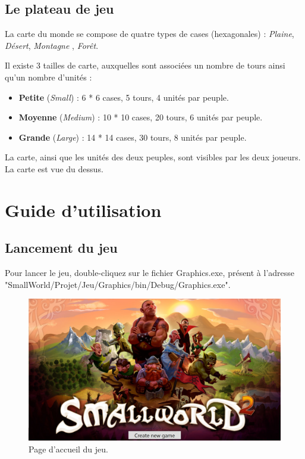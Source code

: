 \subsection{Le plateau de jeu}

La carte du monde se compose de quatre types de cases (hexagonales) : \textit{Plaine}, \textit{Désert}, \textit{Montagne} , \textit{Forêt}.

Il existe 3 tailles de carte, auxquelles sont associées un nombre de tours ainsi qu'un nombre d'unités :

\begin{itemize}

\item \textbf{Petite} (\textit{Small}) : 6 * 6 cases, 5 tours, 4 unités par peuple.
\item \textbf{Moyenne} (\textit{Medium}) : 10 * 10 cases, 20 tours, 6 unités par peuple.
\item \textbf{Grande} (\textit{Large}) : 14 * 14 cases, 30 tours, 8 unités par peuple.

\end{itemize}

La carte, ainsi que les unités des deux peuples, sont visibles par les deux joueurs. La carte est vue du dessus.

\section{Guide d'utilisation}

\subsection{Lancement du jeu}

Pour lancer le jeu, double-cliquez sur le fichier Graphics.exe, présent à l'adresse "SmallWorld/Projet/Jeu/Graphics/bin/Debug/Graphics.exe".

\begin{figure}[!h]
    \centering
    \includegraphics[height=0.50\textwidth]{figure/ecranAccueil.png}
    \caption{Page d'accueil du jeu.}
    \label{fig:ecranAccueil}
\end{figure} 

